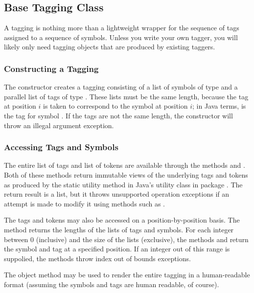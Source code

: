 \subsection{Base Tagging Class}\label{section:tagging-tagger}

A tagging is nothing more than a lightweight wrapper for the sequence
of tags assigned to a sequence of symbols.  Unless you write your own
tagger, you will likely only need tagging objects that are produced by
existing taggers.

\subsubsection{Constructing a Tagging}

The constructor 
creates a tagging consisting of a list of symbols of type  and
a parallel list of tags of type .  These lists must be
the same length, because the tag at position $i$ is taken to
correspond to the symbol at position $i$; in Java terms,
 is the tag for symbol .  If the tags
are not the same length, the constructor will throw an illegal argument
exception.

\subsubsection{Accessing Tags and Symbols}

The entire list of tags and list of tokens are available through the
methods  and .  Both of these methods
return immutable views of the underlying tags and tokens as produced
by the static utility method  in
Java's utility class  in package .
The return result is a list, but it throws unsupported operation
exceptions if an attempt is made to modify it using methods such as
.

The tags and tokens may also be accessed on a position-by-position
basis.  The method  returns the lengths of the lists of
tags and symbols.  For each integer between 0 (inclusive) and the
size of the lists (exclusive), the methods  and
 return the symbol and tag at a specified position.
If an integer out of this range is suppolied, the methods throw
index out of bounds exceptions.

The object method  may be used to render the entire
tagging in a human-readable format (assuming the symbols and tags are
human readable, of course).


